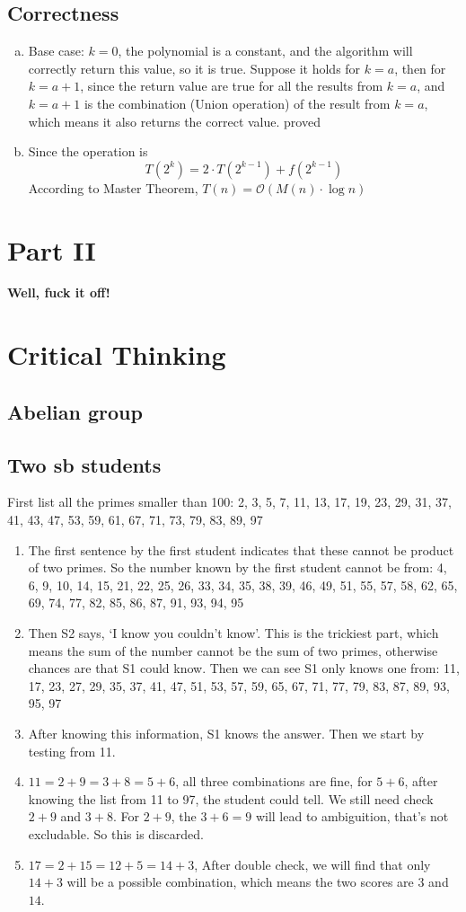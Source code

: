 \documentclass{article}
\begin{document}
\subsection{Correctness}
\begin{enumerate}[a.]
\item Base case: $k=0$, the polynomial is a constant, and the algorithm will correctly return this value, so it is true. Suppose it holds for $k = a$, then for $k = a+1$, since the return value are true for all the results from $k=a$, and $k=a+1$ is the combination (Union operation) of the result from $k=a$, which means it also returns the correct value. proved
\item Since the operation is 
\[
	T(2^k) = 2\cdot T(2^{k-1}) + f(2^{k-1})
\]
According to Master Theorem, $T(n) = \mathcal{O}(M(n) \cdot \log n)$
\end{enumerate}

\section*{Part II}

\Huge \textbf{Well, fuck it off!}
\normalsize
\section{Critical Thinking}
\subsection{Abelian group}
\subsection{Two sb students}
First list all the primes smaller than 100:
2, 3, 5, 7, 11, 13, 17, 19, 23, 29, 31, 37, 41, 43, 47, 53, 59, 61, 67, 71, 73, 79, 83, 89, 97
\begin{enumerate}
\item The first sentence by the first student indicates that these cannot be product of two primes. So the number known by the first student cannot be from: 4, 6, 9, 10, 14, 15, 21, 22, 25, 26, 33, 34, 35, 38, 39, 46, 49, 51, 55, 57, 58, 62, 65, 69, 74, 77, 82, 85, 86, 87, 91, 93, 94, 95
\item Then S2 says, `I know you couldn't know'. This is the trickiest part, which means the sum of the number cannot be the sum of two primes, otherwise chances are that S1 could know. Then we can see S1 only knows one from:
11, 17, 23, 27, 29, 35, 37, 41, 47, 51, 53, 57, 59, 65, 67, 71, 77, 79, 83, 87, 89, 93, 95, 97
\item After knowing this information, S1 knows the answer. Then we start by testing from 11.
\item $11=2+9=3+8=5+6$, all three combinations are fine, for $5+6$, after knowing the list from 11 to 97, the student could tell. We still need check $2+9$ and $3+8$. For $2+9$, the $3+6 = 9$ will lead to ambiguition, that's not excludable. So this is discarded.
\item $17 = 2+15 = 12 + 5 = 14 + 3$, After double check, we will find that only $14+3$ will be a possible combination, which means the two scores are $3$ and $14$.
\end{enumerate}
\end{document}
